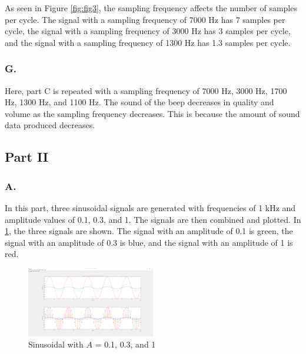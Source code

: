 \documentclass[12pt]{article}
\begin{document}
As seen in Figure \ref{fig:fig3}, the sampling frequency affects the number of samples
per cycle. The signal with a sampling frequency of 7000 Hz has 7 samples per cycle, 
the signal with a sampling frequency of 3000 Hz has 3 samples per cycle, and the signal
with a sampling frequency of 1300 Hz has 1.3 samples per cycle. 

\subsubsection*{G.}
Here, part C is repeated with a sampling frequency of 7000 Hz, 3000 Hz, 1700 Hz, 
1300 Hz, and 1100 Hz. The sound of the beep decreases in quality and volume as the 
sampling frequency decreases. This is because the amount of sound data produced decreases.

\subsection*{Part II}
\subsubsection*{A.}
In this part, three sinusoidal signals are generated with frequencies of 1 kHz and 
amplitude values of 0.1, 0.3, and 1. The signals are then combined and plotted. In 
\ref{fig:fig4}, the three signals are shown. The signal with an amplitude of 0.1 is green,
the signal with an amplitude of 0.3 is blue, and the signal with an amplitude of 1 is red.
\begin{figure}[H]
	\centering
	\includegraphics[width=0.5\textwidth]{fig 2a.png}
	\caption{Sinusoidal with $A$ = 0.1, 0.3, and 1}
	\label{fig:fig4}
\end{figure}
\end{document}
